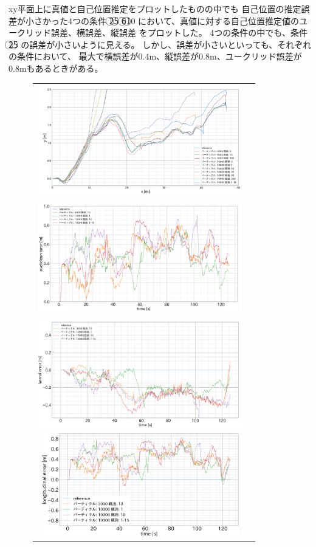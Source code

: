 \documentclass{jarticle}
\begin{document}
xy平面上に真値と自己位置推定をプロットしたものの中でも
自己位置の推定誤差が小さかった4つの条件
\textcircled{\scriptsize 2}\textcircled{\scriptsize 5}\noindent
\textcircled{\scriptsize 6}\textcircled{\scriptsize 10}\noindent
において、真値に対する自己位置推定値のユークリッド誤差、横誤差、縦誤差
をプロットした。
4つの条件の中でも、条件
\textcircled{\scriptsize 2}\textcircled{\scriptsize 5}\noindent
の誤差が小さいように見える。
しかし、誤差が小さいといっても、それぞれの条件において、
最大で横誤差が0.4m、縦誤差が0.8m、ユークリッド誤差が0.8mもあるときがある。

\begin{figure}[htbp]
  \begin{center}
  \begin{tabular}{cc}
  \includegraphics[height=48mm]{fig/x_y.png} \\
  \includegraphics[height=48mm]{fig/euclidean_error.png} \\
  \includegraphics[height=48mm]{fig/lateral_error.png} \\
  \includegraphics[height=45mm]{fig/longitudinal_error.png} 

\end{tabular}
\end{center}
\end{figure}
\end{document}

